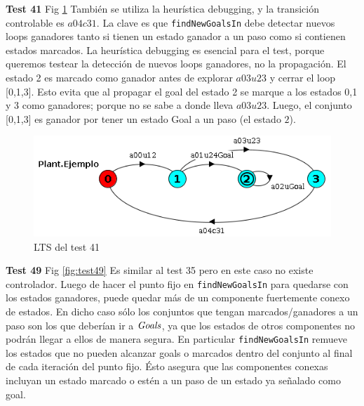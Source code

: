 \FloatBarrier
\textbf{Test 41} Fig \ref{fig:test41}
También se utiliza la heurística debugging, y la transición controlable es $a04c31$. 
La clave es que \texttt{findNewGoalsIn} debe detectar nuevos loops ganadores tanto si tienen un estado ganador a un paso como si contienen estados marcados. 
La heurística debugging es esencial para el test, porque queremos testear la detección de nuevos loops ganadores, no la propagación. El estado 2 es marcado como ganador antes de explorar $a03u23$ y cerrar el loop [0,1,3]. Esto evita que al propagar el goal del estado 2 se marque a los estados 0,1 y 3 como ganadores; porque no se sabe a donde lleva $a03u23$.
Luego, el conjunto [0,1,3] es ganador por tener un estado Goal a un paso (el estado $2$).

\begin{figure}[h]
 \centering
 \includegraphics[scale=0.7]{figures/tests/test41.png}
 \caption{LTS del test 41}
 \label{fig:test41}
\end{figure}


\FloatBarrier
\textbf{Test 49} Fig \ref{fig:test49}
Es similar al test 35 pero en este caso no existe controlador. Luego de hacer el punto fijo en \texttt{findNewGoalsIn} para quedarse con los estados ganadores, puede quedar más de un componente fuertemente conexo de estados. En dicho caso sólo los conjuntos que tengan marcados/ganadores a un paso son los que deberían ir a $\mathit{Goals}$, ya que los estados de otros componentes no podrán llegar a ellos de manera segura. En particular \texttt{findNewGoalsIn} remueve los estados que no pueden alcanzar goals o marcados dentro del conjunto al final de cada iteración del punto fijo. Ésto asegura que las componentes conexas incluyan un estado marcado o estén a un paso de un estado ya señalado como goal.

